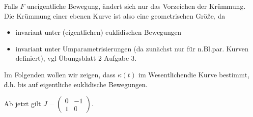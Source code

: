 \documentclass[11pt]{scrbook}
\begin{document}
\begin{note}
Falls $F$ uneigentliche Bewegung, ändert sich nur das Vorzeichen der Krümmung. Die Krümmung einer ebenen Kurve ist also eine geometrischen Größe, da
\begin{itemize}
	\item invariant unter (eigentlichen) euklidischen Bewegungen
	\item invariant unter Umparametrisierungen (da zunächst nur für n.Bl.par. Kurven definiert), vgl Übungsblatt 2 Aufgabe 3.
\end{itemize}
Im Folgenden wollen wir zeigen, dass $\kappa(t)$ \glqq im Wesentlichen\grqq die Kurve bestimmt, d.h. bis auf eigentliche euklidische Bewegungen.
\end{note}

Ab jetzt gilt $J = \begin{pmatrix} 0 & -1 \\ 1 & 0 \end{pmatrix}$.
\end{document}
